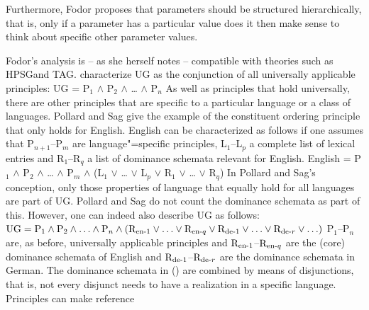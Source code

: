 Furthermore, Fodor proposes that parameters should be structured hierarchically, that is, only if a parameter has a particular value
does it then make sense to think about specific other parameter values.

Fodor's analysis is -- as she herself notes \citep[]{Fodor2001a} -- compatible with theories such as HPSG\indexhpsg and TAG\indextag.
\citet[]{ps} characterize UG as the conjunction of all universally applicable principles:
\ea
UG = P$_1$ $\wedge$ P$_2$ $\wedge$ \ldots{} $\wedge$ P$_n$
\z
As well as principles that hold universally, there are other principles that are specific to a particular language
or a class of languages. Pollard and Sag give the example of the constituent ordering principle that only holds for English.
English can be characterized as follows if one assumes that P$_{n + 1}$--P$_m$ are language"=specific principles,  
L$_{1}$--L$_p$ a complete list of lexical entries and R$_{1}$--R$_q$ a list of dominance schemata relevant for English.
\ea
English = P$_1$ $\wedge$ P$_2$ $\wedge$ \ldots{} $\wedge$ P$_m$ $\wedge$ (L$_{1}$ $\vee$ \ldots{}
$\vee$ L$_p$ $\vee$ R$_{1}$ $\vee$ \ldots{} $\vee$  R$_q$)
\z
In Pollard and Sag's conception, only those properties of language that equally hold for all languages are
part of UG. Pollard and Sag do not count the dominance schemata as part of this. However, one can indeed also describe
UG as follows:
\ea
$
\text{UG} = 
  \text{P}_1 
  \wedge 
  \text{P}_2 
  \wedge 
  \ldots 
  \wedge 
  \text{P}_n 
  \wedge
              (\text{R}_{\text{en}\text{\normalfont -}1} 
              \vee 
              \ldots 
              \vee 
              \text{R}_{\text{en}\text{\normalfont -} q} 
              \vee  
              \text{R}_{\text{de}\text{\normalfont -}1} 
              \vee 
              \ldots 
              \vee 
              \text{R}_{\text{de}\text{\normalfont -} r}
	      \vee 
	      \ldots)
$
\z
P$_1$--P$_n$ are, as before, universally applicable principles and
$\text{R}_{\text{en}\text{\normalfont -}1}$--$\text{R}_{\text{en}\text{\normalfont -} q}$ are the
(core) dominance schemata of English and $\text{R}_{\text{de}\text{\normalfont -}1}$--$\text{R}_{\text{de}\text{\normalfont -} r}$ are the dominance schemata in
German. The dominance schemata in () are combined by means of disjunctions, that is, not every disjunct needs to have a realization in a specific language. Principles can make reference
